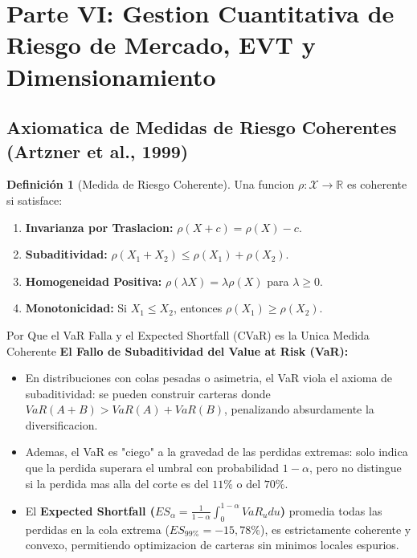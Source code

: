 \documentclass[10pt,a4paper]{article}
\theoremstyle{definition}
\newtheorem{definicion}{\color{primary}\textbf{Definición}}[section]
\begin{document}
\section{Parte VI: Gestion Cuantitativa de Riesgo de Mercado, EVT y Dimensionamiento}

\subsection{Axiomatica de Medidas de Riesgo Coherentes (Artzner et al., 1999)}

\begin{definicion}[Medida de Riesgo Coherente]
Una funcion $\rho: \mathcal{X} \to \mathbb{R}$ es coherente si satisface:
\begin{enumerate}
    \item \textbf{Invarianza por Traslacion:} $\rho(X + c) = \rho(X) - c$.
    \item \textbf{Subaditividad:} $\rho(X_1 + X_2) \le \rho(X_1) + \rho(X_2)$.
    \item \textbf{Homogeneidad Positiva:} $\rho(\lambda X) = \lambda \rho(X)$ para $\lambda \ge 0$.
    \item \textbf{Monotonicidad:} Si $X_1 \le X_2$, entonces $\rho(X_1) \ge \rho(X_2)$.
\end{enumerate}
\end{definicion}

\begin{conceptbox}{Por Que el VaR Falla y el Expected Shortfall (CVaR) es la Unica Medida Coherente}
\textbf{El Fallo de Subaditividad del Value at Risk (VaR):}
\begin{itemize}
    \item En distribuciones con colas pesadas o asimetria, el VaR viola el axioma de subaditividad: se pueden construir carteras donde $VaR(A+B) > VaR(A) + VaR(B)$, penalizando absurdamente la diversificacion.
    \item Ademas, el VaR es "ciego" a la gravedad de las perdidas extremas: solo indica que la perdida superara el umbral con probabilidad $1-\alpha$, pero no distingue si la perdida mas alla del corte es del $11\%$ o del $70\%$.
    \item El \textbf{Expected Shortfall ($ES_\alpha = \frac{1}{1-\alpha}\int_0^{1-\alpha} VaR_u du$)} promedia todas las perdidas en la cola extrema ($ES_{99\%} = -15,78\%$), es estrictamente coherente y convexo, permitiendo optimizacion de carteras sin minimos locales espurios.
\end{itemize}
\end{conceptbox}
\end{document}
